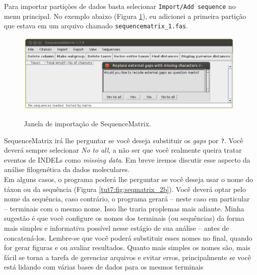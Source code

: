 \begin{refsection}

Para importar partições de dados basta selecionar \texttt{Import/Add sequence} no menu principal. No exemplo abaixo (Figura \ref{tut7:fig:seqmatrix_2}), eu adicionei a primeira partição que estava em um arquivo chamado \texttt{sequencematrix\_1.fas}.


  \begin{figure}[H]
      {\includegraphics[scale=0.5]{figures/tut7/seqmatrix_2.eps}}
	{\caption[Janela de importanção de SequenceMatrix]{Janela de importação de SequenceMatrix.}\label{tut7:fig:seqmatrix_2}}
  \end{figure}


SequenceMatrix irá lhe perguntar se você deseja substituir os \textit{gaps} por \texttt{?}. Você deverá sempre selecionar \textit{No to all}, a não ser que você realmente queira tratar eventos de INDELs como \textit{missing data}. Em breve iremos discutir esse aspecto da análise filogenética da dados moleculares.\\


Em alguns casos, o programa poderá lhe perguntar se você deseja usar o nome do táxon ou da sequência (Figura \ref{tut7:fig:seqmatrix_2b}). Você deverá optar pelo nome da sequência, caso contrário, o programa gerará -- neste caso em particular -- terminais com o mesmo nome. Isso lhe traria proplemas mais adiante. Minha sugestão é que você configure os nomes dos terminais (ou sequências) da forma mais simples e informativa possível nesse estágio de sua análise -- antes de concatená-los. Lembre-se que você poderá substituir esses nomes no final, quando for gerar figuras e ou avaliar resultados. Quanto mais simples os nomes são, mais fácil se torna a tarefa de gerenciar arquivos e evitar erros, principalmente se você está lidando com várias bases de dados para os mesmos terminais



\end{refsection}
